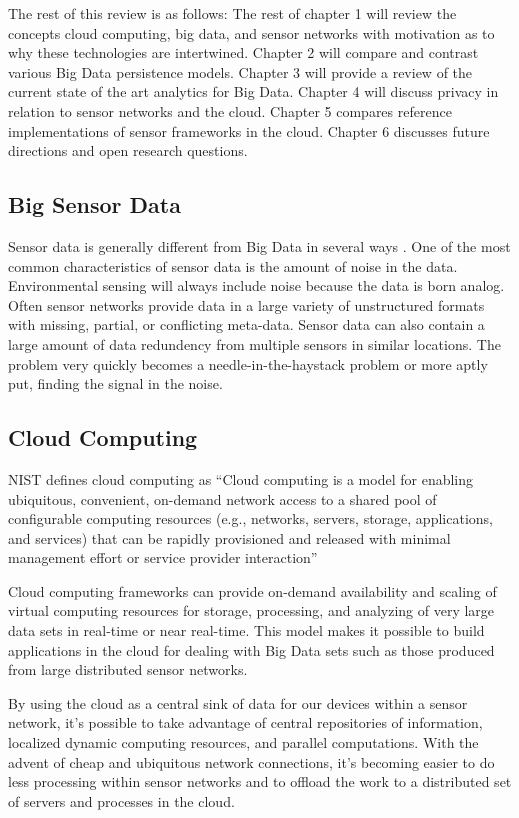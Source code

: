 \documentclass[twocolumn]{article}
\begin{document}
The rest of this review is as follows: The rest of chapter 1 will review the concepts cloud computing, big data, and sensor networks with motivation as to why these technologies are intertwined. Chapter 2 will compare and contrast various Big Data persistence models. Chapter 3 will provide a review of the current state of the art analytics for Big Data. Chapter 4 will discuss privacy in relation to sensor networks and the cloud. Chapter 5 compares reference implementations of sensor frameworks in the cloud. Chapter 6 discusses future directions and open research questions.

\subsection{Big Sensor Data}
Sensor data is generally different from Big Data in several ways \cite{chen_big_2014}. One of the most common characteristics of sensor data is the amount of noise in the data. Environmental sensing will always include noise because the data is born analog\cite{pcast}. Often sensor networks provide data in a large variety of unstructured formats with missing, partial, or conflicting meta-data. Sensor data can also contain a large amount of data redundency from multiple sensors in similar locations. The problem very quickly becomes a needle-in-the-haystack problem or more aptly put, finding the signal in the noise.

\subsection{Cloud Computing}
NIST\cite{mell2011nist} defines cloud computing as ``Cloud computing is a model for enabling ubiquitous, convenient, on-demand network access to a shared pool of configurable computing resources (e.g., networks, servers, storage, applications, and services) that can be rapidly provisioned and released with minimal management effort or service provider interaction''

Cloud computing frameworks can provide on-demand availability and scaling of virtual computing resources for storage, processing, and analyzing of very large data sets in real-time or near real-time. This model makes it possible to build applications in the cloud for dealing with Big Data sets such as those produced from large distributed sensor networks.

By using the cloud as a central sink of data for our devices within a sensor network, it's possible to take advantage of central repositories of information, localized dynamic computing resources, and parallel computations.  With the advent of cheap and ubiquitous network connections, it's becoming easier to do less processing within sensor networks and to offload the work to a distributed set of servers and processes in the cloud\cite{kamburugamuve_framework_2015}.
\end{document}
